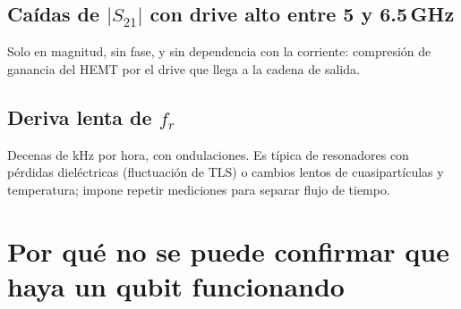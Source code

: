 \documentclass[11pt,a4paper]{article}
\newcommand{\fr}{f_r}
\begin{document}
\subsection{Caídas de $|S_{21}|$ con drive alto entre 5 y 6.5\,GHz}

Solo en magnitud, sin fase, y sin dependencia con la corriente: compresión de ganancia del HEMT por el drive que
llega a la cadena de salida.

\subsection{Deriva lenta de $\fr$}

Decenas de kHz por hora, con ondulaciones. Es típica de resonadores con pérdidas dieléctricas (fluctuación de TLS) o
cambios lentos de cuasipartículas y temperatura; impone repetir mediciones para separar flujo de tiempo.

\section{Por qué no se puede confirmar que haya un qubit funcionando}
\end{document}
